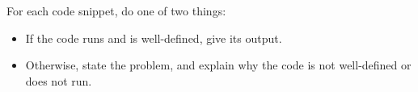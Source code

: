 
For each code snippet, do one of two things:
\begin{itemize}
\item If the code runs and is well-defined, give its output.
\item Otherwise, state the problem, and explain why the code is not well-defined or does not run.
\end{itemize}


\begin{small}

\end{small}

\vfill


\begin{small}

\end{small}

\vfill

\newpage


\begin{small}

\end{small}

\vfill
